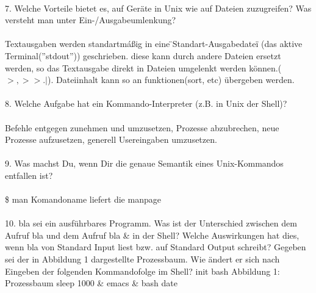 \documentclass{article}
\begin{document}
\\
7. Welche Vorteile bietet es, auf Geräte in Unix wie auf Dateien zuzugreifen? Was versteht
man unter Ein-/Ausgabeumlenkung?
\\
\\
Textausgaben werden standartm\'a\ss ig in eine \"{}Standart-Ausgabedatei\"{} (das aktive Terminal(''stdout'')) geschrieben. diese kann durch andere Dateien ersetzt werden, so das Textausgabe direkt in Dateien umgelenkt werden k\"onnen.($>,>>.|$).
Dateiinhalt kann so an funktionen(sort, etc) \"ubergeben werden.
\\
\\
8. Welche Aufgabe hat ein Kommando-Interpreter (z.B. in Unix der Shell)?
\\
\\
Befehle entgegen zunehmen und umzusetzen, Prozesse abzubrechen, neue Prozesse aufzusetzen, generell Usereingaben umzusetzen.
\\
\\
9. Was machst Du, wenn Dir die genaue Semantik eines Unix-Kommandos entfallen ist?
\\
\\
\$ man Komandoname liefert die manpage
\\
\\
10. bla sei ein ausführbares Programm. Was ist der Unterschied zwischen dem Aufruf bla und
dem Aufruf bla \& in der Shell? Welche Auswirkungen hat dies, wenn bla von Standard
Input liest bzw. auf Standard Output schreibt? Gegeben sei der in Abbildung 1 dargestellte
Prozessbaum. Wie ändert er sich nach Eingeben der folgenden Kommandofolge im Shell?
init
bash
Abbildung 1: Prozessbaum
sleep 1000 \&
emacs \&
bash
date
\end{document}
